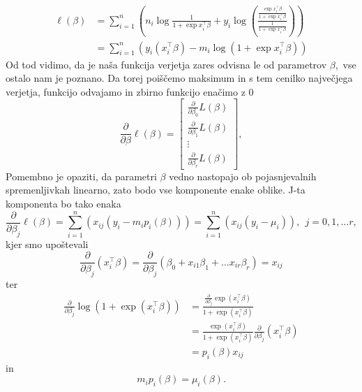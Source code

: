 \documentclass[12pt,a4paper]{amsart}
\theoremstyle{definition} %
\theoremstyle{plain} %
\begin{document}
\begin{align}
    \ell(\beta)  &= \sum_{i=1}^{n}\left( n_{i}\log{\frac{1}{1 + \exp{x_{i}^\top\beta}}}  + y_{i}\log{\left( \frac{\frac{\exp{x_{i}^{\top} \beta}}{1 + \exp{x_{i}^\top\beta}}}{\frac{1}{1 + \exp{x_{i}^\top\beta}}}  \right)} \right) \nonumber\\
                &= \sum_{i=1}^{n}\left( y_{i}(x_{i}^\top\beta) - m_{i}\log(1 + \exp{x_{i}^\top\beta})\right)
\end{align}
Od tod vidimo, da je naša funkcija verjetja zares odvisna le od parametrov $\beta$,~vse ostalo nam je poznano. Da torej poiščemo maksimum in s tem
cenilko največjega verjetja, funkcijo odvajamo in zbirno funkcijo enačimo z 0
\[
    \frac{\partial}{\partial \beta}\ell(\beta) = \begin{bmatrix}
                                 \frac{\partial}{\partial \beta_{0}}L(\beta) \\
                                 \frac{\partial}{\partial \beta_{1}}L(\beta) \\
                                 \vdots \\
                                 \frac{\partial}{\partial \beta_{r}}L(\beta)
                        \end{bmatrix},
\]
Pomembno je opaziti, da parametri $\beta$ vedno nastopajo ob pojasnjevalnih spremenljivkah linearno, zato bodo vse komponente enake oblike.
J-ta komponenta bo tako enaka
\begin{equation}
    \frac{\partial}{\partial \beta_{j}} \ell(\beta) = \sum_{i=1}^{n} \left(x_{ij}(y_{i} - m_{i}p_{i}(\beta))\right) = \sum_{i=1}^{n} \left(x_{ij}(y_{i} - \mu_{i})\right),~~j = 0,1,\ldots r,
\end{equation}
kjer smo upoštevali
\[
    \frac{\partial}{\partial \beta_{j}}(x_{i}^\top\beta) = \frac{\partial}{\partial \beta_{j}}\left(\beta_{0} + x_{i1}\beta_{1} + \ldots x_{ir}\beta_{r}\right) = x_{ij}
\]
ter
\begin{align}                                         
    \frac{\partial}{\partial \beta_{j}} \log(1 + \exp(x_{i}^\top\beta)) &= \frac{ \frac{\partial}{\partial \beta_{j}}\exp(x_{i}^\top\beta) }{1 + \exp(x_{i}^\top\beta)} \nonumber \\
    &= \frac{\exp(x_{i}^\top\beta)}{1 + \exp(x_{i}^\top\beta)} \frac{\partial}{\partial \beta_{j}} (x_{i}^\top\beta) \nonumber \\
    &=p_{i}(\beta)x_{ij}
\end{align}
in
\[
    m_{i}p_{i}(\beta) = \mu_{i}(\beta).
\]
\end{document}
